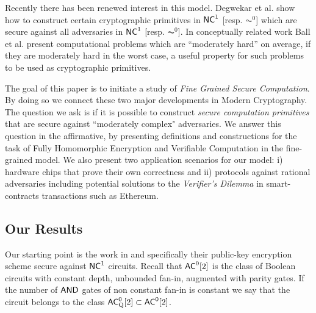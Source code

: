 Recently there has been renewed interest in this model. Degwekar et al. \cite{fgcrypto} show how to construct certain cryptographic 
primitives in ${\mathsf{NC}}^1$ [resp. $\AC^0$] which are secure against all adversaries in ${\mathsf{NC}}^1$ [resp. $\AC^0$]. In conceptually related work Ball et al. \cite{fghardness} present computational problems which are ``moderately hard'' on average, if they are moderately hard in the worst case, a useful property for such problems to be used as cryptographic primitives. 

The goal of this paper is to initiate a study of {\em Fine Grained Secure Computation}. By doing so we connect these two major developments in Modern Cryptography. The question we ask is if it is possible to construct {\em secure computation primitives} that are secure against ``moderately complex" adversaries. We answer this question in the affirmative, by presenting definitions and constructions for the task of Fully Homomorphic Encryption and Verifiable Computation in the fine-grained model. We also present two application scenarios for our model: i) hardware chips that prove their own correctness and ii) protocols against rational adversaries including potential solutions to the {\em Verifier's Dilemma} in smart-contracts transactions such as Ethereum. 

\subsection{Our Results}

Our starting point is the work in \cite{fgcrypto} and specifically their public-key encryption scheme secure against ${\mathsf{NC}}^1$ circuits. Recall that ${\mathsf{AC}}^0[2]$ is the class of Boolean circuits with constant depth, unbounded fan-in, 
augmented with parity gates. If the number of $\mathsf{AND}$ gates of non constant fan-in is constant we say that the circuit belongs to the class ${\mathsf{AC}}^0_{\text{Q}}[2] \subset {\ensuremath{\mathsf{AC}}}^0[2]$.

